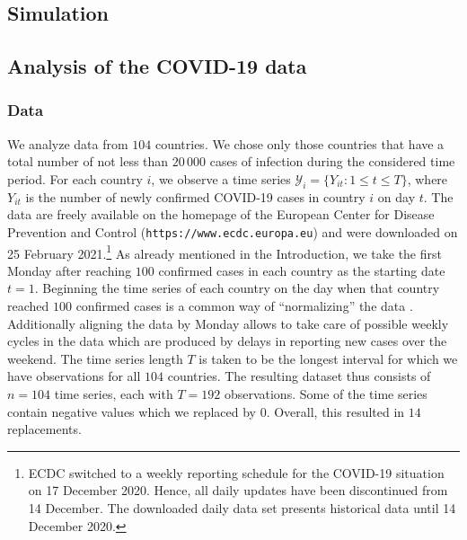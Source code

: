 \documentclass[a4paper,11pt]{article}
\numberwithin{equation}{section}
\begin{document}
\subsection{Simulation}\label{subsec:sim}

\subsection{Analysis of the COVID-19 data}\label{subsec:app}

\subsubsection{Data}


We analyze data from $104$ countries. We chose only those countries that have a total number of not less than $20\,000$ cases of infection during the considered time period. For each country $i$, we observe a time series $\mathcal{Y}_i = \{ Y_{it}: 1 \le t \le T \}$, where $Y_{it}$ is the number of newly confirmed COVID-19 cases in country $i$ on day $t$. The data are freely available on the homepage of the European Center for Disease Prevention and Control (\texttt{https://www.ecdc.europa.eu}) and were downloaded on 25 February 2021.\footnote{ECDC switched to a weekly reporting schedule for the COVID-19 situation on 17 December 2020. Hence, all daily updates have been discontinued from 14 December. The downloaded daily data set presents historical data until 14 December 2020.} As already mentioned in the Introduction, we take the first Monday after reaching $100$ confirmed cases in each country as the starting date $t=1$. Beginning the time series of each country on the day when that country reached $100$ confirmed cases is a common way of ``normalizing'' the data \citep[see e.g.][]{Cohen2020}. Additionally aligning the data by Monday allows to take care of possible weekly cycles in the data which are produced by delays in reporting new cases over the weekend. The time series length $T$ is taken to be the longest interval for which we have observations for all $104$ countries. The resulting dataset thus consists of $n = 104$ time series, each with $T = 192$ observations. Some of the time series contain negative values which we replaced by $0$. Overall, this resulted in $14$ replacements.
\end{document}
